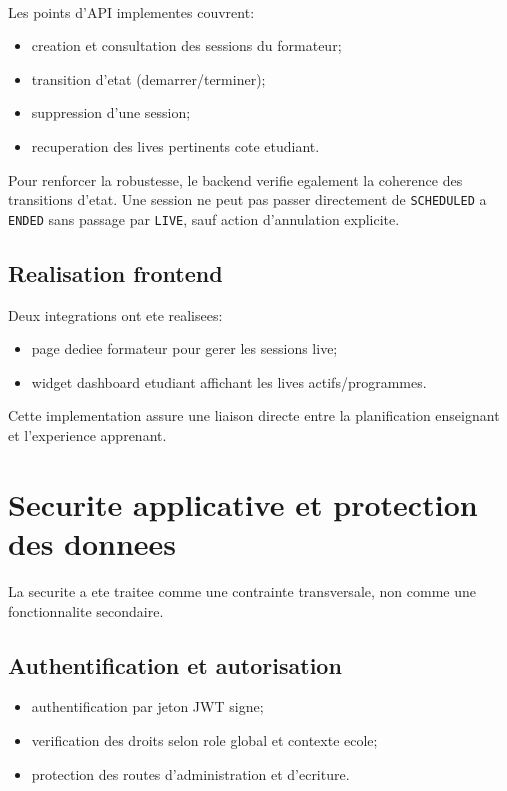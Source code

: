 ﻿﻿\documentclass[12pt,a4paper,oneside]{report}
\begin{document}
Les points d'API implementes couvrent:
\begin{itemize}
  \item creation et consultation des sessions du formateur;
  \item transition d'etat (demarrer/terminer);
  \item suppression d'une session;
  \item recuperation des lives pertinents cote etudiant.
\end{itemize}

Pour renforcer la robustesse, le backend verifie egalement la coherence des transitions d'etat. Une session ne peut pas passer directement de \texttt{SCHEDULED} a \texttt{ENDED} sans passage par \texttt{LIVE}, sauf action d'annulation explicite.

\subsection{Realisation frontend}

Deux integrations ont ete realisees:
\begin{itemize}
  \item page dediee formateur pour gerer les sessions live;
  \item widget dashboard etudiant affichant les lives actifs/programmes.
\end{itemize}

Cette implementation assure une liaison directe entre la planification enseignant et l'experience apprenant.

\section{Securite applicative et protection des donnees}

La securite a ete traitee comme une contrainte transversale, non comme une fonctionnalite secondaire.

\subsection{Authentification et autorisation}

\begin{itemize}
  \item authentification par jeton JWT signe;
  \item verification des droits selon role global et contexte ecole;
  \item protection des routes d'administration et d'ecriture.
\end{itemize}
\end{document}
